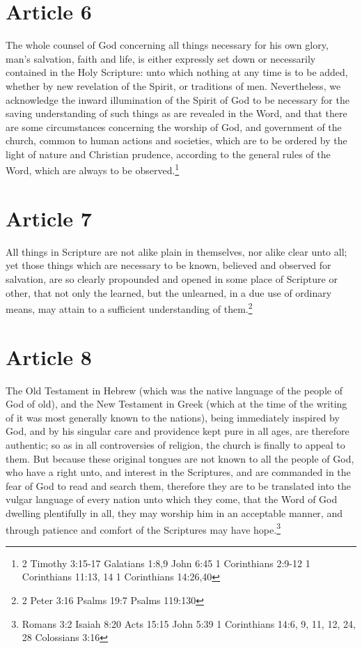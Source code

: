 \documentclass[12pt,letterpaper]{book}
\begin{document}
\section{Article 6}

The whole counsel of God concerning all things necessary for his own glory, man's salvation, faith and life, is either expressly set down or necessarily contained in the Holy Scripture: unto which nothing at any time is to be added, whether by new revelation of the Spirit, or traditions of men. Nevertheless, we acknowledge the inward illumination of the Spirit of God to be necessary for the saving understanding of such things as are revealed in the Word, and that there are some circumstances concerning the worship of God, and government of the church, common to human actions and societies, which are to be ordered by the light of nature and Christian prudence, according to the general rules of the Word, which are always to be observed.\footnote{2 Timothy 3:15-17 Galatians 1:8,9 John 6:45 1 Corinthians 2:9-12 1 Corinthians 11:13, 14 1 Corinthians 14:26,40}

\section{Article 7}

All things in Scripture are not alike plain in themselves, nor alike clear unto all; yet those things which are necessary to be known, believed and observed for salvation, are so clearly propounded and opened in some place of Scripture or other, that not only the learned, but the unlearned, in a due use of ordinary means, may attain to a sufficient understanding of them.\footnote{2 Peter 3:16 Psalms 19:7 Psalms 119:130}

\section{Article 8}

The Old Testament in Hebrew (which was the native language of the people of God of old), and the New Testament in Greek (which at the time of the writing of it was most generally known to the nations), being immediately inspired by God, and by his singular care and providence kept pure in all ages, are therefore authentic; so as in all controversies of religion, the church is finally to appeal to them. But because these original tongues are not known to all the people of God, who have a right unto, and interest in the Scriptures, and are commanded in the fear of God to read and search them, therefore they are to be translated into the vulgar language of every nation unto which they come, that the Word of God dwelling plentifully in all, they may worship him in an acceptable manner, and through patience and comfort of the Scriptures may have hope.\footnote{Romans 3:2 Isaiah 8:20 Acts 15:15 John 5:39 1 Corinthians 14:6, 9, 11, 12, 24, 28 Colossians 3:16}
\end{document}
